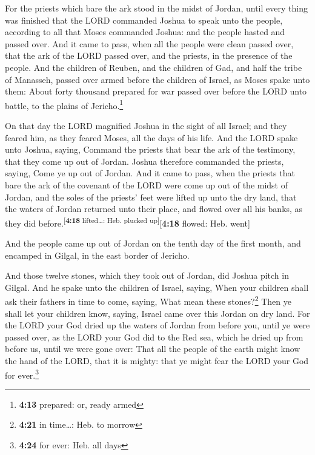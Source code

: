  For the priests which bare the ark stood in the midst of
Jordan, until every thing was finished that the LORD commanded Joshua to
speak unto the people, according to all that Moses commanded Joshua: and
the people hasted and passed over.  And it came to pass,
when all the people were clean passed over, that the ark of the LORD
passed over, and the priests, in the presence of the people.
 And the children of Reuben, and the children of Gad, and
half the tribe of Manasseh, passed over armed before the children of
Israel, as Moses spake unto them:  About forty thousand
prepared for war passed over before the LORD unto battle, to the plains
of Jericho.\footnote{\textbf{4:13} prepared: or, ready armed}

 On that day the LORD magnified Joshua in the sight of
all Israel; and they feared him, as they feared Moses, all the days of
his life.  And the LORD spake unto Joshua, saying,
 Command the priests that bear the ark of the testimony,
that they come up out of Jordan.  Joshua therefore
commanded the priests, saying, Come ye up out of Jordan. 
And it came to pass, when the priests that bare the ark of the covenant
of the LORD were come up out of the midst of Jordan, and the soles of
the priests' feet were lifted up unto the dry land, that the waters of
Jordan returned unto their place, and flowed over all his banks, as they
did before.\textsuperscript{{[}\textbf{4:18} lifted\ldots: Heb. plucked
up{]}}{[}\textbf{4:18} flowed: Heb. went{]}

 And the people came up out of Jordan on the tenth day of
the first month, and encamped in Gilgal, in the east border of Jericho.

 And those twelve stones, which they took out of Jordan,
did Joshua pitch in Gilgal.  And he spake unto the
children of Israel, saying, When your children shall ask their fathers
in time to come, saying, What mean these stones?\footnote{\textbf{4:21}
  in time\ldots: Heb. to morrow}  Then ye shall let your
children know, saying, Israel came over this Jordan on dry land.
 For the LORD your God dried up the waters of Jordan from
before you, until ye were passed over, as the LORD your God did to the
Red sea, which he dried up from before us, until we were gone over:
 That all the people of the earth might know the hand of
the LORD, that it is mighty: that ye might fear the LORD your God for
ever.\footnote{\textbf{4:24} for ever: Heb. all days}

